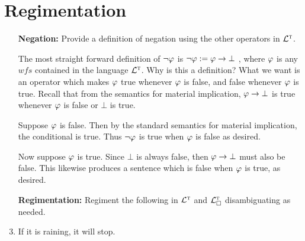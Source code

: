 \documentclass[a4paper, 11pt]{article}                  %
\begin{document}

\section{Regimentation}

\begin{enumerate}

  \item[\bf Negation:] Provide a definition of negation using the other operators in $\mathcal{L}^{\textsc{t}}$.
   { %
    The most straight forward definition of $\neg \varphi$ is $ \neg \varphi:= \varphi\rightarrow \bot$ , where $\varphi$ is any $wfs$ contained in the language $\mathcal{L}^{\textsc{t}}$.
     Why is this a definition? What we want is an operator which makes $\varphi$ true whenever $\varphi$ is false, and false whenever $\varphi$ is true. 
     Recall that from the semantics for material implication, $ \varphi \rightarrow \bot$ is true whenever $\varphi$ is false or $\bot$ is true.
     
     Suppose $\varphi$ is false. Then by the standard semantics for material implication, the conditional is true. 
     Thus $\neg \varphi$ is true when $\varphi$ is false as desired. 

     Now suppose $\varphi$ is true. 
     Since $\bot$ is always false, then $\varphi \rightarrow \bot$ must also be false. 
     This likewise produces a sentence which is false when $\varphi$ is true, as desired. 

  }

	\item[\bf Regimentation:] Regiment the following in $\mathcal{L}^{\textsc{t}}$ and $\mathcal{L}^{\textsc{t}}_\square$ disambiguating as needed.

    \item If it is raining, it will stop.


\end{enumerate}
\end{document}
